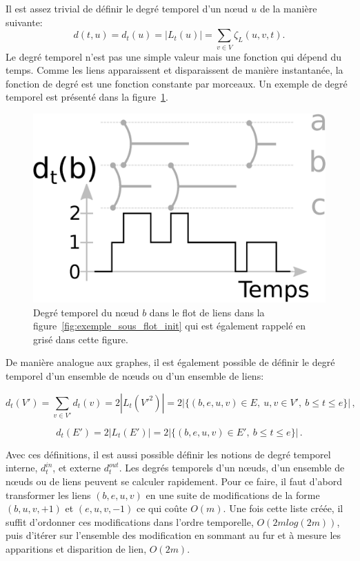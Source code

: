 Il est assez trivial de définir le degré temporel d'un n\oe ud $u$ de la manière suivante:
\begin{equation}
d(t,u)=d_t(u)= |L_t(u)|= \sum_{v \in V} \zeta_{L}(u,v,t).
\end{equation}
Le degré temporel n'est pas une simple valeur mais une fonction qui dépend du temps.
Comme les liens apparaissent et disparaissent de manière instantanée, la fonction de degré est une fonction constante par morceaux.
Un exemple de degré temporel est présenté dans la figure~\ref{fig:exemple_degre}.

\begin{figure}
\centering
\includegraphics[width=0.5\linewidth]{img/Intro/degre2.eps}
\caption{Degré temporel du n\oe ud $b$ dans le flot de liens dans la figure~\ref{fig:exemple_sous_flot_init} qui est également rappelé en grisé dans cette figure.
}
\label{fig:exemple_degre}
\end{figure}

De manière analogue aux graphes, il est également possible de définir le degré temporel d'un ensemble de n\oe uds ou d'un ensemble de liens:

\begin{equation}
d_t(V')= \sum_{v \in V'} d_t(v) = 2 |L_{t}(V'^2)| = 2|\{(b,e,u,v) \in E,\ u,v \in V',\ b \leq t \leq e\}|\,,
\end{equation}

\begin{equation}
d_t(E')=2|L_{t}(E')|= 2|\{(b,e,u,v) \in E',\ b \leq t \leq e\}|\,.
\end{equation}

Avec ces définitions, il est aussi possible définir les notions de degré temporel interne, $d_t^{in}$, et externe $d_t^{out}$.
Les degrés temporels d'un n\oe uds, d'un ensemble de n\oe uds ou de liens peuvent se calculer rapidement.
Pour ce faire, il faut d'abord transformer les liens $(b,e,u,v)$ en une suite de modifications de la forme $(b,u,v,+1)$ et $(e,u,v,-1)$ ce qui coûte $O(m)$.
Une fois cette liste créée, il suffit d'ordonner ces modifications dans l'ordre temporelle, $O(2mlog(2m))$, puis d'itérer sur l'ensemble des modification en sommant au fur et à mesure les apparitions et disparition de lien, $O(2m)$.
\bigskip


